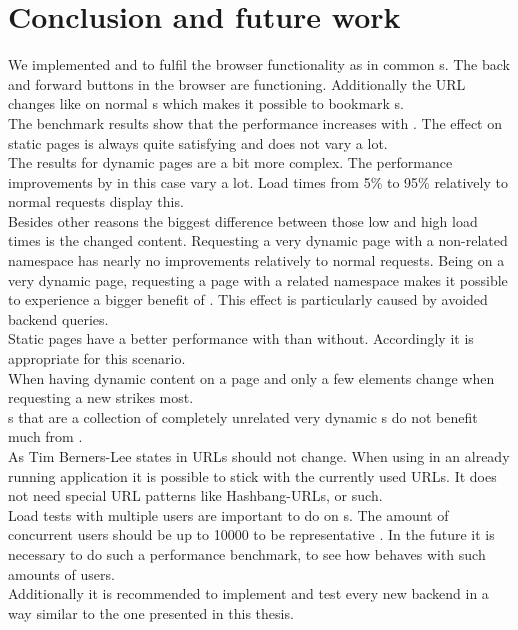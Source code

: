 \section{Conclusion and future work\label{chap:conclusion}}

We implemented \phpLare{} and \twigLare{} to fulfil the browser functionality as in common \webApplication{}s.
The back and forward buttons in the browser are functioning.
Additionally the URL changes like on normal \webApplication{}s which makes it possible to bookmark \webPage{}s.
\\
The benchmark results show that the performance increases with \lare{}.
The effect on static pages is always quite satisfying and does not vary a lot.
\\
The results for dynamic pages are a bit more complex.
The performance improvements by \lare{} in this case vary a lot.
Load times from 5\% to 95\% relatively to normal requests display this.
\\
Besides other reasons the biggest difference between those low and high load times is the changed content.
Requesting a very dynamic page with a non-related namespace has nearly no improvements relatively to normal requests.
Being on a very dynamic page, requesting a page with a related namespace makes it possible to experience a bigger benefit of \lare{}.
This effect is particularly caused by avoided backend queries.
\\
Static pages have a better performance with \lare{} than without.
Accordingly it is appropriate for this scenario.
\\
When having dynamic content on a page and only a few elements change when requesting a new \webPage{} \lare{} strikes most.
\\
\WebSite{}s that are a collection of completely unrelated very dynamic \webPage{}s do not benefit much from \lare{}.
\\
As Tim Berners-Lee states in \cite{berners1998cool} URLs should not change.
When using \lare{} in an already running application it is possible to stick with the currently used URLs.
It does not need special URL patterns like Hashbang-URLs, or such.
\\
Load tests with multiple users are important to do on \webApplication{}s.
The amount of concurrent users should be up to 10000 to be representative \cite{bozdag2008performance}.
In the future it is necessary to do such a performance benchmark, to see how \lare{} behaves with such amounts of users.
\\
Additionally it is recommended to implement and test every new \lare{} backend in a way similar to the one presented in this thesis.